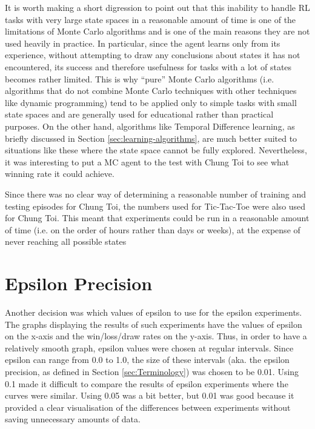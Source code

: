 \documentclass[11pt,a4paper]{report}
\begin{document}
It is worth making a short digression to point out that this inability to handle RL tasks with very large state spaces in a reasonable amount of time is one of the limitations of Monte Carlo algorithms and is one of the main reasons they are not used heavily in practice. In particular, since the agent learns only from its experience, without attempting to draw any conclusions about states it has not encountered, its success and therefore usefulness for tasks with a lot of states becomes rather limited. This is why ``pure'' Monte Carlo algorithms (i.e. algorithms that do not combine Monte Carlo techniques with other techniques like dynamic programming) tend to be applied only to simple tasks with small state spaces and are generally used for educational rather than practical purposes. On the other hand, algorithms like Temporal Difference learning, as briefly discussed in Section \ref{sec:learning-algorithms}, are much better suited to situations like these where the state space cannot be fully explored. Nevertheless, it was interesting to put a MC agent to the test with Chung Toi to see what winning rate it could achieve.

Since there was no clear way of determining a reasonable number of training and testing episodes for Chung Toi, the numbers used for Tic-Tac-Toe were also used for Chung Toi. This meant that experiments could be run in a reasonable amount of time (i.e. on the order of hours rather than days or weeks), at the expense of never reaching all possible states


\section{Epsilon Precision}
\label{sec:epsilon-precision}

Another decision was which values of epsilon to use for the epsilon experiments. The graphs displaying the results of such experiments have the values of epsilon on the x-axis and the win/loss/draw rates on the y-axis. Thus, in order to have a relatively smooth graph, epsilon values were chosen at regular intervals. Since epsilon can range from 0.0 to 1.0, the size of these intervals (aka. the epsilon precision, as defined in Section \ref{sec:Terminology}) was chosen to be 0.01. Using 0.1 made it difficult to compare the results of epsilon experiments where the curves were similar. Using 0.05 was a bit better, but 0.01 was good because it provided a clear visualisation of the differences between experiments without saving unnecessary amounts of data.
\end{document}
